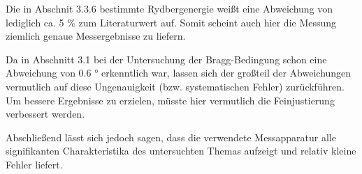 Die in Abschnit 3.3.6 bestimmte Rydbergenergie weißt eine Abweichung von lediglich
ca. 5 $\%$ zum Literaturwert auf. Somit scheint auch hier die Messung ziemlich
genaue Messergebnisse zu liefern.

Da in Abschnitt 3.1 bei der Untersuchung der Bragg-Bedingung schon eine Abweichung
von 0.6 ° erkenntlich war, lassen sich der großteil der Abweichungen vermutlich
auf diese Ungenauigkeit (bzw. systematischen Fehler) zurückführen. Um bessere
Ergebnisse zu erzielen, müsste
hier vermutlich die Feinjustierung verbessert werden.

Abschließend lässt sich jedoch sagen, dass die verwendete Messapparatur alle
signifikanten Charakteristika des untersuchten Themas aufzeigt und relativ
kleine Fehler liefert.
